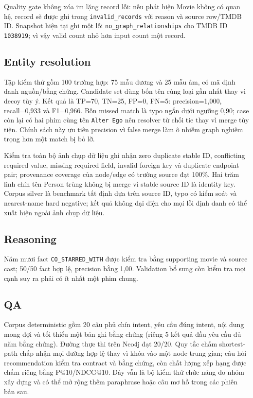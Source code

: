 Quality gate không xóa im lặng record lỗi: nếu phát hiện Movie không có quan hệ,
record sẽ được ghi trong \texttt{invalid\_records} với reason và source row/TMDB ID.
Snapshot hiện tại ghi một lỗi \texttt{no\_graph\_relationships} cho TMDB ID
\texttt{1038919}; vì vậy valid count nhỏ hơn input count một record.

\subsection{Entity resolution}

Tập kiểm thử gồm 100 trường hợp: 75 mẫu dương và 25 mẫu âm, có mã định danh
nguồn/bằng chứng.
Candidate set dùng bốn tên cùng loại gần nhất thay vì decoy tùy ý. Kết quả là
TP=70, TN=25, FP=0, FN=5: precision=1,000, recall=0,933 và F1=0,966. Bốn missed
match là typo ngắn dưới ngưỡng 0,90; case còn lại có hai phim cùng tên \texttt{Alter Ego}
nên resolver từ chối tie thay vì merge tùy tiện. Chính sách này ưu tiên precision
vì false merge làm ô nhiễm graph nghiêm trọng hơn một match bị bỏ lỡ.

Kiểm tra toàn bộ ảnh chụp dữ liệu
ghi nhận zero duplicate stable ID, conflicting required value, missing required
field, invalid foreign key và duplicate endpoint pair; provenance coverage của
node/edge có trường source đạt 100\%. Hai trăm linh chín tên Person trùng không bị merge
vì stable source ID là identity key. Corpus silver là benchmark tất định dựa trên
source ID, typo có kiểm soát và nearest-name hard negative; kết quả không đại diện
cho mọi lỗi định danh có thể xuất hiện ngoài ảnh chụp dữ liệu.

\subsection{Reasoning}

Năm mươi fact \texttt{CO\_STARRED\_WITH} được kiểm tra bằng supporting movie và
source cast; 50/50 fact hợp lệ, precision bằng 1,00. Validation bổ sung còn kiểm
tra mọi cạnh suy ra phải có ít nhất một phim chung.

\subsection{QA}

Corpus deterministic gồm 20 câu phủ chín intent, yêu cầu đúng intent, nội dung
mong đợi và tối thiểu một bản ghi bằng chứng (riêng 5 kết quả đầu yêu cầu đủ năm bằng chứng).
Đường thực thi trên Neo4j đạt 20/20. Quy tắc chấm shortest-path chấp nhận mọi
đường hợp lệ thay vì khóa vào một node trung gian; câu hỏi recommendation kiểm tra contract
và bằng chứng, còn chất lượng xếp hạng được chấm riêng bằng P@10/NDCG@10. Đây vẫn là
bộ kiểm thử chức năng do nhóm xây dựng và có thể mở rộng thêm paraphrase hoặc câu
mơ hồ trong các phiên bản sau.

